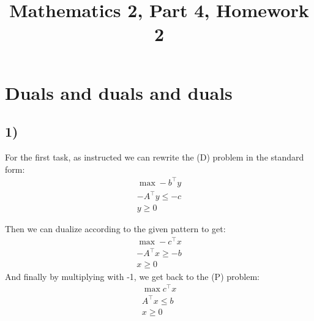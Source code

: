 \documentclass[9pt]{IEEEtran}
\title{\vspace{0ex}
Mathematics 2, Part 4, Homework 2}
\begin{document}
\maketitle
\section{Duals and duals and duals}
\subsection*{1)}
For the first task, as instructed we can rewrite the (D) problem in the 
standard form: 
\[
\begin{aligned}
\max -b^\top y \\ 
-A^\top y \le -c \\
 y \ge 0
\end{aligned}
\]

Then we can dualize according to the given pattern to get:
\[
\begin{aligned}
\max -c^\top x \\ 
-A^\top x \ge -b \\
 x \ge 0
\end{aligned}
\]
And finally by multiplying with -1, we get back to the (P) problem:
\[
\begin{aligned}
\max c^\top x \\ 
A^\top x \le b \\
 x \ge 0
\end{aligned}
\]
\end{document}
